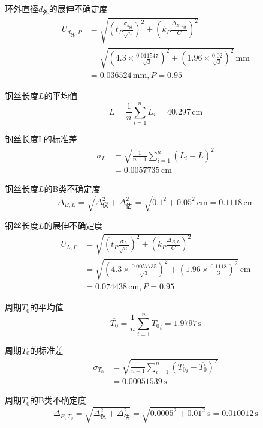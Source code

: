 \documentclass[12pt,a4paper]{article}
\begin{document}
    环外直径$d_\text{外}$的展伸不确定度
    \[
        \begin{aligned}
            U_{d_\text{外},P}&=\sqrt{\left(t_P\frac{\sigma_{d_\text{外}}}{\sqrt{n}}\right)^2+\left(k_P\frac{\Delta_{B,d_\text{外}}}{C}\right)^2}\\
            &=\sqrt{\left(4.3\times\frac{0.011547}{\sqrt{3}}\right)^2+\left(1.96\times\frac{0.02}{\sqrt{3}}\right)^2}\,\mathrm{mm}\\
            &=0.036524\,\mathrm{mm},P=0.95
        \end{aligned}
    \]

    钢丝长度$L$的平均值
    \[
        \overline{L}=\frac{1}{n}\sum_{i=1}^{n}L_i=40.297\,\mathrm{cm}
    \]

    钢丝长度L的标准差
    \[
        \begin{aligned}
            \sigma_{L}&=\sqrt{\frac{1}{n-1}\sum_{i=1}^n\left(L_i-\overline{L}\right)^2}\\
            &=0.0057735\,\mathrm{cm}
        \end{aligned}
    \]

    钢丝长度$L$的B类不确定度
    \[
        \Delta_{B,L}=\sqrt{\Delta_\text{仪}^2+\Delta_\text{估}^2}=\sqrt{0.1^2+0.05^2}\,\mathrm{cm}=0.1118\,\mathrm{cm}
    \]

    钢丝长度$L$的展伸不确定度
    \[
        \begin{aligned}
            U_{L,P}&=\sqrt{\left(t_P\frac{\sigma_{L}}{\sqrt{n}}\right)^2+\left(k_P\frac{\Delta_{B,L}}{C}\right)^2}\\
            &=\sqrt{\left(4.3\times\frac{0.0057735}{\sqrt{3}}\right)^2+\left(1.96\times\frac{0.1118}{3}\right)^2}\,\mathrm{cm}\\
            &=0.074438\,\mathrm{cm},P=0.95
        \end{aligned}
    \]

    周期$T_0$的平均值
    \[
        \overline{T_0}=\frac{1}{n}\sum_{i=1}^{n}{T_0}_i=1.9797\,\mathrm{s}
    \]

    周期$T_0$的标准差
    \[
        \begin{aligned}
        \sigma_{T_0}&=\sqrt{\frac{1}{n-1}\sum_{i=1}^n\left({T_0}_i-\overline{T_0}\right)^2}\\
        &=0.00051539\,\mathrm{s}
        \end{aligned}
    \]

    周期$T_0$的B类不确定度
    \[
        \Delta_{B,T_0}=\sqrt{\Delta_\text{仪}^2+\Delta_\text{估}^2}=\sqrt{0.0005^2+0.01^2}\,\mathrm{s}=0.010012\,\mathrm{s}
    \]
\end{document}
